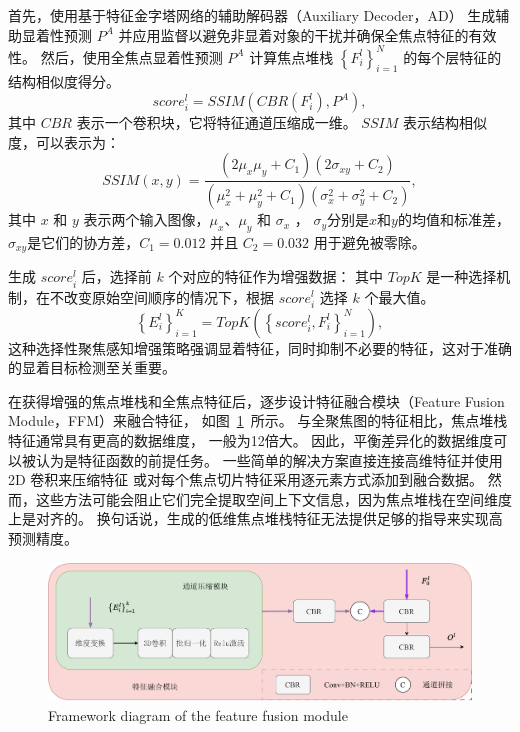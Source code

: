首先，使用基于特征金字塔网络的辅助解码器（Auxiliary Decoder，AD）
生成辅助显着性预测 $ P^{A} $ 并应用监督以避免非显着对象的干扰并确保全焦点特征的有效性。 
然后，使用全焦点显着性预测 $ P^{A} $ 计算焦点堆栈 $ \left \{ F_{i}^{l} \right \}_{i=1}^{N} $ 的每个层特征的结构相似度得分。 
\begin{equation}
	score_{i}^{l} = SSIM \left ( CBR \left ( F_{i}^{l} \right ), P^{A} \right ),
\end{equation}
%
%
其中 $CBR$ 表示一个卷积块，它将特征通道压缩成一维。 $SSIM$ 表示结构相似度，可以表示为： 
%
%
\begin{equation} 	
	SSIM(x,y)=\frac{\left ( 2\mu_{x}\mu_{y}+C_{1} \right ) \left (  2\sigma_{xy}+C_{2} \right )  } 	
	{\left ( \mu_{x}^{2} + \mu_{y}^{2}+C_{1}\right ) \left ( \sigma_{x}^{2}+ \sigma_{y}^{2} + C_{2} \right ) } , 	
\end{equation}
其中 $x$ 和 $y$ 表示两个输入图像，$\mu_{x}$、$\mu_{y}$ 和 $\sigma_{x}$ ， $\sigma_{y}$分别是$x$和$y$的均值和标准差，$\sigma_{xy}$是它们的协方差，$C_{1} = 0.012$ 并且 $C_{2} = 0.032$ 用于避免被零除。 
%
%
%
%
\par
%
%
生成 $ score_{i}^{l} $ 后，选择前 $k$ 个对应的特征作为增强数据：
其中 $ TopK $ 是一种选择机制，在不改变原始空间顺序的情况下，根据 $ score_{i}^{l} $ 选择 $k$ 个最大值。 
\begin{equation}
	\left \{ E_{i}^{l} \right \}_{i=1}^{K} = TopK \left ( \left \{ score_{i}^{l}, F_{i}^{l} \right \}_{i=1}^{N} \right ), 	
\end{equation}
%
%
这种选择性聚焦感知增强策略强调显着特征，同时抑制不必要的特征，这对于准确的显着目标检测至关重要。
%
%
%
%
\par
%
%
在获得增强的焦点堆栈和全焦点特征后，逐步设计特征融合模块（Feature Fusion Module，FFM）来融合特征，
如图~\ref{cpt3_fig1:ccm}~所示。
与全聚焦图的特征相比，焦点堆栈特征通常具有更高的数据维度， 一般为12倍大。 
因此，平衡差异化的数据维度可以被认为是特征函数的前提任务。
一些简单的解决方案直接连接高维特征并使用 2D 卷积来压缩特征
或对每个焦点切片特征采用逐元素方式添加到融合数据。 然而，这些方法可能会阻止它们完全提取空间上下文信息，因为焦点堆栈在空间维度上是对齐的。 换句话说，生成的低维焦点堆栈特征无法提供足够的指导来实现高预测精度。 





\begin{figure}[t]
	\centering
	\includegraphics[width=0.95\linewidth]{figures/chapter3/ccm}
	{Framework diagram of the feature fusion module}
	\label{cpt3_fig1:ccm}
\end{figure}




